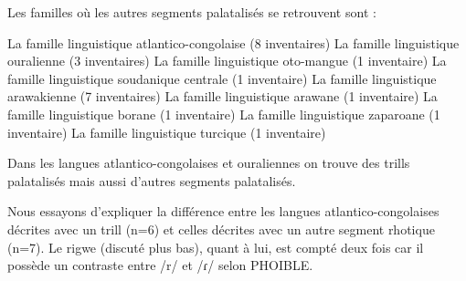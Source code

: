 Les familles où les autres segments  palatalisés se retrouvent sont :

\begin{exe}
		\ex \begin{xlist}
	\ex La famille linguistique atlantico-congolaise  (8 inventaires)
	\ex La famille linguistique ouralienne  (3 inventaires)
	\ex La famille linguistique oto-mangue  (1 inventaire)
	\ex La famille linguistique soudanique centrale  (1 inventaire)
	\ex La famille linguistique arawakienne  (7 inventaires)
	\ex La famille linguistique arawane  (1 inventaire)
	\ex La famille linguistique borane  (1 inventaire)
	\ex La famille linguistique zaparoane  (1 inventaire)
	\ex La famille linguistique turcique  (1 inventaire)
	\end{xlist}
\end{exe}

Dans les langues atlantico-congolaises et ouraliennes on trouve des trills palatalisés mais aussi d'autres segments  palatalisés.

Nous essayons d'expliquer la différence entre les langues atlantico-congolaises décrites avec un trill (n=6) et celles décrites avec un autre segment rhotique (n=7). Le rigwe (discuté plus bas), quant à lui, est compté deux fois car il possède un contraste entre /r/ et /ɾ/ selon PHOIBLE.

